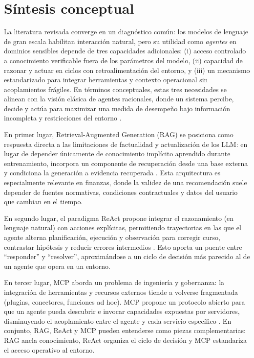 \documentclass[
	spanish, %
	letterpaper, oneside
]{book}
\begin{document}
\section{Síntesis conceptual}

La literatura revisada converge en un diagnóstico común: los modelos de lenguaje de gran escala habilitan interacción natural, pero su utilidad como \emph{agentes} en dominios sensibles depende de tres capacidades adicionales: (i) acceso controlado a conocimiento verificable fuera de los parámetros del modelo, (ii) capacidad de razonar y actuar en ciclos con retroalimentación del entorno, y (iii) un mecanismo estandarizado para integrar herramientas y contexto operacional sin acoplamientos frágiles. En términos conceptuales, estas tres necesidades se alinean con la visión clásica de agentes racionales, donde un sistema percibe, decide y actúa para maximizar una medida de desempeño bajo información incompleta y restricciones del entorno \cite{russell2010aima}.

En primer lugar, Retrieval-Augmented Generation (RAG) se posiciona como respuesta directa a las limitaciones de factualidad y actualización de los LLM: en lugar de depender únicamente de conocimiento implícito aprendido durante entrenamiento, incorpora un componente de recuperación desde una base externa y condiciona la generación a evidencia recuperada \cite{yu2024rag_survey}. Esta arquitectura es especialmente relevante en finanzas, donde la validez de una recomendación suele depender de fuentes normativas, condiciones contractuales y datos del usuario que cambian en el tiempo.

En segundo lugar, el paradigma ReAct propone integrar el razonamiento (en lenguaje natural) con acciones explícitas, permitiendo trayectorias en las que el agente alterna planificación, ejecución y observación para corregir curso, contrastar hipótesis y reducir errores intermedios \cite{yao2023react}. Esto aporta un puente entre “responder” y “resolver”, aproximándose a un ciclo de decisión más parecido al de un agente que opera en un entorno.

En tercer lugar, MCP aborda un problema de ingeniería y gobernanza: la integración de herramientas y recursos externos tiende a volverse fragmentada (plugins, conectores, funciones ad hoc). MCP propone un protocolo abierto para que un agente pueda descubrir e invocar capacidades expuestas por servidores, disminuyendo el acoplamiento entre el agente y cada servicio específico \cite{hou2025mcp}. En conjunto, RAG, ReAct y MCP pueden entenderse como piezas complementarias: RAG ancla conocimiento, ReAct organiza el ciclo de decisión y MCP estandariza el acceso operativo al entorno.
\end{document}
